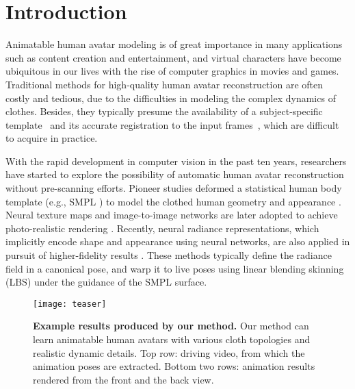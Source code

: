 \section{Introduction}
\label{sec:intro}


Animatable human avatar modeling is of great importance in many applications such as content creation and entertainment, and virtual characters have become ubiquitous in our lives with the rise of computer graphics in movies and games. Traditional methods for high-quality human avatar reconstruction are often costly and tedious, due to the difficulties in modeling the complex dynamics of clothes. Besides, they typically presume the availability of a subject-specific template~\cite{habermann2021realtimeDDC} and its accurate registration to the input frames~\cite{timur2021driving_signal,Xiang2021ModelingClothing}, which are difficult to acquire in practice.

With the rapid development in computer vision in the past ten years, researchers have started to explore the possibility of automatic human avatar reconstruction without pre-scanning efforts. Pioneer studies deformed a statistical human body template (e.g., SMPL \cite{loper2015smpl}) to model the clothed human geometry and appearance \cite{alldieck2018videoavatar,alldieck2018videoavatar_detailed,alldieck19octopus}. Neural texture maps and image-to-image networks are later adopted to achieve photo-realistic rendering \cite{Liu2018Neural,liu2020NeuralHumanRendering,Shysheya2019TNR,raj2020anr}. Recently, neural radiance representations, which implicitly encode shape and appearance using neural networks, are also applied in pursuit of higher-fidelity results \cite{peng2021animatable_nerf,noguchi2021narf,neural_actors}. These methods typically define the radiance field in a canonical pose, and warp it to live poses using linear blending skinning (LBS) under the guidance of the SMPL surface. 


\begin{figure}
    \centering
    \texttt{[image: teaser]}
    \caption{\textbf{Example results produced by our method.} Our method can learn animatable human avatars with various cloth topologies and realistic dynamic details. Top row: driving video, from which the animation poses are extracted. Bottom two rows: animation results rendered from the front and the back view.  }
    \label{fig:teaser}
\end{figure}


